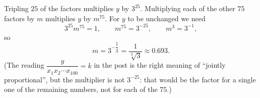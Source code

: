 Tripling $25$ of the factors multiplies $y$ by $3^{25}$. Multiplying each of the other $75$ factors by $m$ multiplies $y$ by $m^{75}$. For $y$ to be unchanged we need
\[3^{25}m^{75}=1,\qquad m^{75}=3^{-25},\qquad m^{3}=3^{-1},\]
so
\[m=\boxed{3^{-\dfrac{1}{3}}=\dfrac{1}{\sqrt[3]3}}\approx0.693 .\]
(The reading $\dfrac{y}{x_1x_2\cdots x_{100}}=k$ in the post is the right meaning of ``jointly proportional'', but the multiplier is not $3^{-25}$: that would be the factor for a single one of the remaining numbers, not for each of the $75$.)
